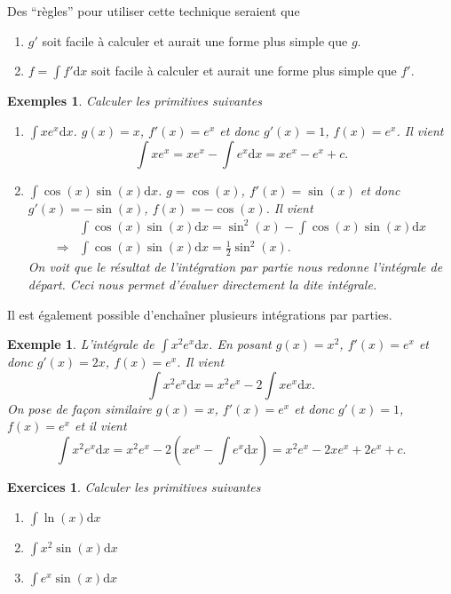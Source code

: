 \documentclass[a4paper,12pt]{book}
\newcommand{\dd}{\mathrm{d}}
\newtheorem*{exemples}{Exemples}
\newtheorem*{exemple}{Exemple}
\newtheorem*{exercices}{Exercices}
\begin{document}
Des ``règles'' pour utiliser cette technique seraient que 
\begin{enumerate}
\item $g'$ soit facile à calculer et aurait une forme plus simple que $g$.
\item $f=\int f'\dd x$ soit facile à calculer et aurait une forme plus simple que $f'$.
\end{enumerate}
\begin{exemples}
Calculer les primitives suivantes
 \begin{enumerate}
  \item $\int x e^x\dd x$. $g(x)=x$, $f'(x)=e^x$ et donc $g'(x)=1$, $f(x)=e^x$. Il vient
  \begin{equation}
    \int x e^x=x e^x-\int e^x\dd x=x e^x-e^x+c.
  \end{equation}
  \item $\int \cos(x)\sin(x)\dd x$. $g= \cos(x)$, $f'(x)=\sin(x)$ et donc $g'(x)=-\sin(x)$, $f(x)=-\cos(x)$. Il vient
  \begin{align}
    &\int \cos(x)\sin(x)\dd x=\sin^2(x)-\int \cos(x)\sin(x)\dd x\nonumber\\
    \Rightarrow &\int \cos(x)\sin(x)\dd x=\frac{1}{2}\sin^2(x).
  \end{align}
  On voit que le résultat de l'intégration par partie nous redonne l'intégrale de départ. Ceci nous permet d'évaluer directement la dite intégrale.
 \end{enumerate}

\end{exemples}
Il est également possible d'enchaîner plusieurs intégrations par parties.
\begin{exemple}
L'intégrale de $\int x^2 e^x\dd x$. En posant $g(x)=x^2$, $f'(x)=e^x$ et donc $g'(x)=2x$, $f(x)=e^x$. Il vient
\begin{equation}
 \int x^2 e^x\dd x=x^2e^x-2\int x e^x\dd x.
\end{equation}
On pose de façon similaire $g(x)=x$, $f'(x)=e^x$ et donc $g'(x)=1$, $f(x)=e^x$ et il vient
\begin{equation}
\int x^2 e^x\dd x=x^2e^x-2\left(x e^x -\int e^x\dd x\right)=x^2e^x-2x e^x +2e^x+c.
\end{equation}
\end{exemple}

\begin{exercices}
Calculer les primitives suivantes
\begin{enumerate}
 \item $\int \ln(x)\dd x$
 \item $\int x^2 \sin(x)\dd x$
 \item $\int e^x\sin(x)\dd x$
\end{enumerate}

\end{exercices}
\end{document}
